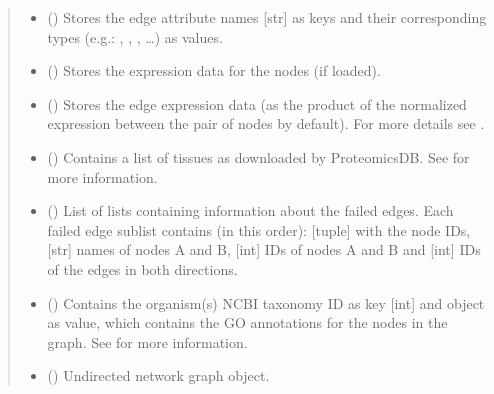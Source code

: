 \documentclass[letterpaper,10pt,english]{sphinxmanual}
\begin{document}
\begin{fulllineitems}
\begin{quote}
\begin{description}
\begin{itemize}
\item {} 
 () \textendash{} Stores the edge attribute names {[}str{]} as keys and their
corresponding types (e.g.: , , , …) as
values.

\item {} 
 () \textendash{} Stores the expression data for the nodes (if loaded).

\item {} 
 () \textendash{} Stores the edge expression data (as the product of the
normalized expression between the pair of nodes by default). For
more details see {\hyperref[\detokenize{reference:pypath.main.PyPath.edges_expression}]{}}.

\item {} 
 () \textendash{} Contains a list of tissues as downloaded by ProteomicsDB. See
{\hyperref[\detokenize{reference:pypath.main.PyPath.get_proteomicsdb}]{}} for more information.

\item {} 
 () \textendash{} List of lists containing information about the failed edges.
Each failed edge sublist contains (in this order): {[}tuple{]} with
the node IDs, {[}str{]} names of nodes A and B, {[}int{]} IDs of nodes
A and B and {[}int{]} IDs of the edges in both directions.

\item {} 
 () \textendash{} Contains the organism(s) NCBI taxonomy ID as key {[}int{]} and
 object as value, which
contains the GO annotations for the nodes in the graph. See
 for more information.

\item {} 
 () \textendash{} Undirected network graph object.


\end{itemize}
\end{description}
\end{quote}
\end{fulllineitems}
\end{document}
